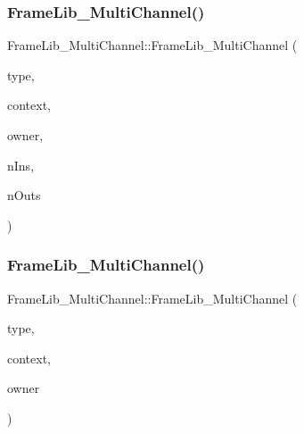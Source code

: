 \subsubsection{\texorpdfstring{Frame\+Lib\+\_\+\+Multi\+Channel()}{FrameLib\_MultiChannel()}\hspace{0.1cm}{\footnotesize\ttfamily [1/2]}}
{\footnotesize\ttfamily Frame\+Lib\+\_\+\+Multi\+Channel\+::\+Frame\+Lib\+\_\+\+Multi\+Channel (\begin{DoxyParamCaption}\item[{\hyperlink{_frame_lib___types_8h_a842c5e2e69277690b064bf363c017980}{Object\+Type}}]{type,  }\item[{\hyperlink{class_frame_lib___context}{Frame\+Lib\+\_\+\+Context}}]{context,  }\item[{void $\ast$}]{owner,  }\item[{unsigned long}]{n\+Ins,  }\item[{unsigned long}]{n\+Outs }\end{DoxyParamCaption})\hspace{0.3cm}{\ttfamily [inline]}}

\mbox{\label{class_frame_lib___multi_channel_aa336f53f31444970053d7a28f97c2c9a}} 
\subsubsection{\texorpdfstring{Frame\+Lib\+\_\+\+Multi\+Channel()}{FrameLib\_MultiChannel()}\hspace{0.1cm}{\footnotesize\ttfamily [2/2]}}
{\footnotesize\ttfamily Frame\+Lib\+\_\+\+Multi\+Channel\+::\+Frame\+Lib\+\_\+\+Multi\+Channel (\begin{DoxyParamCaption}\item[{\hyperlink{_frame_lib___types_8h_a842c5e2e69277690b064bf363c017980}{Object\+Type}}]{type,  }\item[{\hyperlink{class_frame_lib___context}{Frame\+Lib\+\_\+\+Context}}]{context,  }\item[{void $\ast$}]{owner }\end{DoxyParamCaption})\hspace{0.3cm}{\ttfamily [inline]}}

